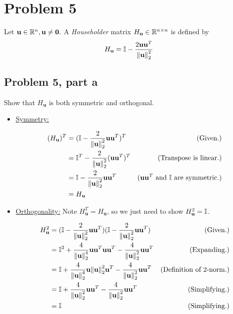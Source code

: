 \newpage
\section{Problem 5}
Let $\textbf{u} \in \mathbb{R}^n, \textbf{u}\neq \textbf{0}.$ A \textit{Householder} matrix $H_\textbf{u} \in \mathbb{R}^{n\times n}$ is defined by 
\[
H_\textbf{u} = \mathbb{I} - \frac{2\textbf{u}\textbf{u}^T}{\norm{\textbf{u}}_2^2}
\]
\subsection{Problem 5, part a}
Show that $H_\textbf{u}$ is both symmetric and orthogonal.
\partbreak
\begin{solution}

    \begin{itemize}
        \item \underline{Symmetry:}

        \begin{align*}
            (H_\textbf{u})^T &= (\mathbb{I} - \frac{2}{\norm{\textbf{u}}_2^2}\textbf{u}\textbf{u}^T)^T &\text{(Given.)}\\
            &= \mathbb{I}^T - \frac{2}{\norm{\textbf{u}}_2^2}(\textbf{u}\textbf{u}^T)^T &\text{(Transpose is linear.)}\\
            &= \mathbb{I} - \frac{2}{\norm{\textbf{u}}_2^2}\textbf{u}\textbf{u}^T &\text{($\textbf{u}\textbf{u}^T$ and $\mathbb{I}$ are symmetric.)}\\
            &= H_\textbf{u}
        \end{align*}

        \item \underline{Orthogonality:}
            Note $H_\textbf{u}^T = H_\textbf{u}$, so we just need to show $H_\textbf{u}^2 = \mathbb{I}$.

            \begin{align*}
                H_\textbf{u}^2 &= (\mathbb{I} - \frac{2}{\norm{\textbf{u}}_2^2}\textbf{u}\textbf{u}^T)(\mathbb{I} - \frac{2}{\norm{\textbf{u}}_2^2}\textbf{u}\textbf{u}^T) &\text{(Given.)}\\
                &= \mathbb{I}^2 +\frac{4}{\norm{\textbf{u}}_2^4}\textbf{u}\textbf{u}^T\textbf{u}\textbf{u}^T - \frac{4}{\norm{\textbf{u}}_2^2}\textbf{u}\textbf{u}^T &\text{(Expanding.)}\\
                &= \mathbb{I} +\frac{4}{\norm{\textbf{u}}_2^4}\textbf{u}\norm{\textbf{u}}_2^2\textbf{u}^T - \frac{4}{\norm{\textbf{u}}_2^2}\textbf{u}\textbf{u}^T &\text{(Definition of 2-norm.)}\\
                &= \mathbb{I} +\frac{4}{\norm{\textbf{u}}_2^2}\textbf{u}\textbf{u}^T - \frac{4}{\norm{\textbf{u}}_2^2}\textbf{u}\textbf{u}^T &\text{(Simplifying.)}\\
                &= \mathbb{I} &\text{(Simplifying.)}
            \end{align*}
    \end{itemize}
\end{solution}

